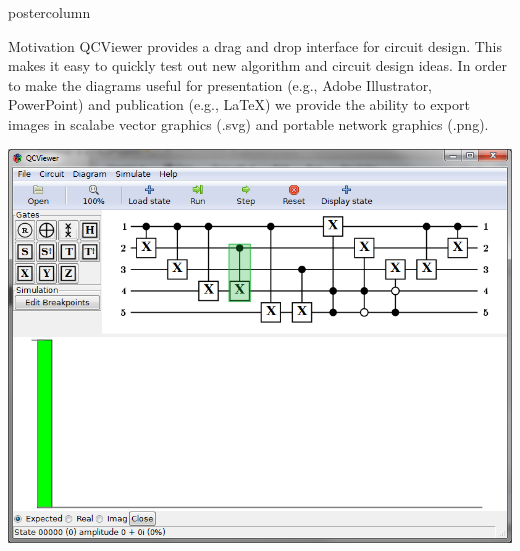 \documentclass[final]{beamer} %
\begin{document}
\begin{frame}{}
\begin{columns}
\begin{column}{.33\textwidth}
\begin{beamercolorbox}[center,wd=\textwidth]{postercolumn}
\begin{minipage}[T]{.95\textwidth}
\begin{block}{\large Motivation}
                QCViewer provides a drag and drop interface for circuit design. 
                This makes it easy to quickly test out new algorithm and circuit design ideas. 
                In order to make the diagrams useful for presentation (e.g., Adobe Illustrator, PowerPoint) and publication (e.g., \LaTeX) we provide the ability to export images in scalabe vector graphics (.svg) and portable network graphics (.png).
                \begin{center} 
                    \includegraphics{figures/Motivation.png}
                \end{center}
            \end{block}
        \end{minipage}
        \end{beamercolorbox}
        \end{column}


\end{columns}
\end{frame}
\end{document}
